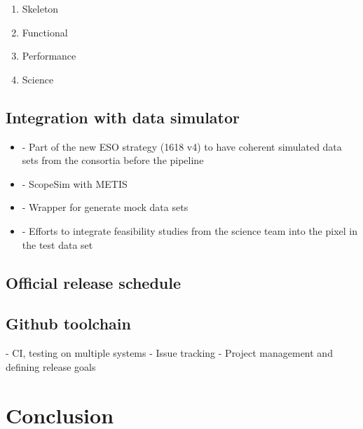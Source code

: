 \documentclass[a4paper]{spie}  %
\begin{document}
 \begin{enumerate}
     \item Skeleton
     \item Functional
     \item Performance
     \item Science
 \end{enumerate}

\subsection{Integration with data simulator}
\label{ssec:dev_scopesim}

 \begin{itemize}
     \item - Part of the new ESO strategy (1618 v4) to have coherent simulated data sets from the consortia before the pipeline
     \item - ScopeSim with METIS
     \item - Wrapper for generate mock data sets
     \item - Efforts to integrate feasibility studies from the science team into the pixel in the test data set
 \end{itemize}

 
\subsection{Official release schedule}
\label{ssec:dev_releases}



\subsection{Github toolchain}
\label{ssec:dev_testing}
	- CI, testing on multiple systems
	- Issue tracking
	- Project management and defining release goals

\section{Conclusion}
\label{sec:conclusion}



\appendix    %

\acknowledgments %


\end{document}
